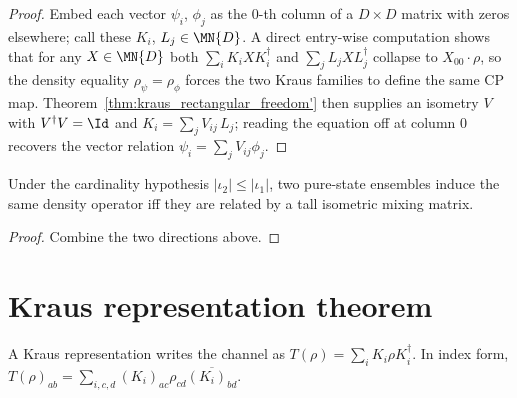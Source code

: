 \begin{proof}
    \leanok
    Embed each vector $\psi_i$, $\phi_j$ as the $0$-th column of a
    $D \times D$ matrix with zeros elsewhere; call these
    $K_i$, $L_j \in \MN{D}$. A direct entry-wise computation
    shows that for any $X \in \MN{D}$ both
    $\sum_i K_i X K_i^\dagger$ and $\sum_j L_j X L_j^\dagger$ collapse
    to $X_{00} \cdot \rho$, so the density equality
    $\rho_\psi = \rho_\phi$ forces the two Kraus families to define the
    same CP map. Theorem~\ref{thm:kraus_rectangular_freedom'} then supplies an
    isometry $V$ with $V^\dagger V = \Id$ and
    $K_i = \sum_j V_{ij}\,L_j$; reading the equation off at column $0$
    recovers the vector relation
    $\psi_i = \sum_j V_{ij} \phi_j$.
\end{proof}

\begin{theorem}
    \label{thm:pureEnsembleDensity_eq_iff_exists_isometric_mixing}
    \leanok
    Under the cardinality hypothesis $|\iota_2| \le |\iota_1|$, two
    pure-state ensembles induce the same density operator iff they are
    related by a tall isometric mixing matrix.
\end{theorem}

\begin{proof}
    \leanok
    Combine the two directions above.
\end{proof}

\section{Kraus representation theorem}
\label{sec:kraus_representation}

A Kraus representation writes the channel as
$T(\rho)=\sum_i K_i\rho K_i^\dagger$. In index form,
$T(\rho)_{ab}=\sum_{i,c,d}(K_i)_{ac}\rho_{cd}\overline{(K_i)_{bd}}$.

